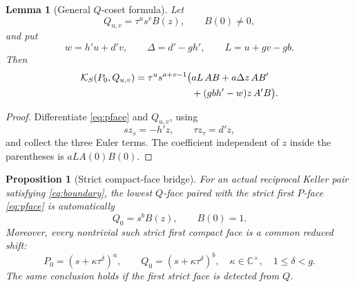 \documentclass[11pt]{article}
\newtheorem{proposition}[theorem]{Proposition}
\newtheorem{lemma}[theorem]{Lemma}
\theoremstyle{definition}
\theoremstyle{remark}
\newcommand{\C}{\mathbb C}
\newcommand{\KS}{\mathcal K_S}
\begin{document}
\begin{lemma}[General \(Q\)-coset formula]
\label{lem:coset}
Let
\[
 Q_{u,v}=\tau^us^vB(z),\qquad B(0)\neq0,
\]
and put
\[
 w=h'u+d'v,\qquad
 \Delta=d'-gh',\qquad
 L=u+gv-gb.
\]
Then
\begin{align}
 \KS(P_0,Q_{u,v})
 =\tau^us^{a+v-1}\bigl(
 &aL\,AB+a\Delta z\,AB'\notag\\
 &+(gbh'-w)z\,A'B
 \bigr).
\label{eq:coset}
\end{align}
\end{lemma}

\begin{proof}
Differentiate \eqref{eq:pface} and \(Q_{u,v}\), using
\[
 s z_s=-h'z,\qquad \tau z_\tau=d'z,
\]
and collect the three Euler terms.  The coefficient independent of
\(z\) inside the parentheses is \(aL A(0)B(0)\).
\end{proof}

\begin{proposition}[Strict compact-face bridge]
\label{prop:strict-face}
For an actual reciprocal Keller pair satisfying \eqref{eq:boundary},
the lowest \(Q\)-face paired with the strict first \(P\)-face
\eqref{eq:pface} is automatically
\[
 Q_0=s^bB(z),\qquad B(0)=1.
\]
Moreover, every nontrivial such strict first compact face is a common
reduced shift:
\begin{equation}
 \boxed{
 P_0=(s+\kappa\tau^\delta)^a,\qquad
 Q_0=(s+\kappa\tau^\delta)^b,
 \quad
 \kappa\in\C^\times,\quad 1\leq\delta<g.
 }
\label{eq:reduced-face}
\end{equation}
The same conclusion holds if the first strict face is detected from
\(Q\).
\end{proposition}
\end{document}

